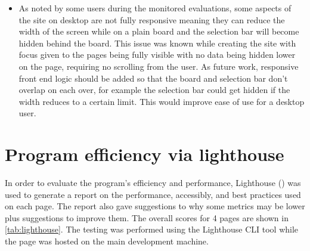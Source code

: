 \documentclass{l4proj}
\begin{document}
\begin{itemize}
    \item As noted by some users during the monitored evaluations, some aspects of the site on desktop are not fully responsive meaning they can reduce the width of the screen while on a plain board and the selection bar will become hidden behind the board. This issue was known while creating the site with focus given to the pages being fully visible with no data being hidden lower on the page, requiring no scrolling from the user. As future work, responsive front end logic should be added so that the board and selection bar don't overlap on each over, for example the selection bar could get hidden if the width reduces to a certain limit. This would improve ease of use for a desktop user.
\end{itemize}

\section{Program efficiency via lighthouse}
\label{section:efficiency}
In order to evaluate the program's efficiency and performance, Lighthouse (\cite{noauthor_lighthouse_nodate}) was used to generate a report on the performance, accessibly, and best practices used on each page. The report also gave suggestions to why some metrics may be lower plus suggestions to improve them. The overall scores for 4 pages are shown in \ref{tab:lighthouse}. The testing was performed using the Lighthouse CLI tool while the page was hosted on the main development machine. 
\end{document}
